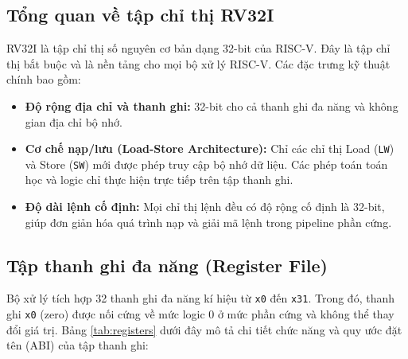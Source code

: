 \subsection{Tổng quan về tập chỉ thị RV32I}
RV32I là tập chỉ thị số nguyên cơ bản dạng 32-bit của RISC-V. Đây là tập chỉ thị bắt buộc và là nền tảng cho mọi bộ xử lý RISC-V. Các đặc trưng kỹ thuật chính bao gồm:
\begin{itemize}
    \item \textbf{Độ rộng địa chỉ và thanh ghi:} 32-bit cho cả thanh ghi đa năng và không gian địa chỉ bộ nhớ.
    \item \textbf{Cơ chế nạp/lưu (Load-Store Architecture):} Chỉ các chỉ thị Load (\texttt{LW}) và Store (\texttt{SW}) mới được phép truy cập bộ nhớ dữ liệu. Các phép toán toán học và logic chỉ thực hiện trực tiếp trên tập thanh ghi.
    \item \textbf{Độ dài lệnh cố định:} Mọi chỉ thị lệnh đều có độ rộng cố định là 32-bit, giúp đơn giản hóa quá trình nạp và giải mã lệnh trong pipeline phần cứng.
\end{itemize}

\subsection{Tập thanh ghi đa năng (Register File)}
Bộ xử lý tích hợp 32 thanh ghi đa năng kí hiệu từ \texttt{x0} đến \texttt{x31}. Trong đó, thanh ghi \texttt{x0} (zero) được nối cứng về mức logic 0 ở mức phần cứng và không thể thay đổi giá trị. Bảng \ref{tab:registers} dưới đây mô tả chi tiết chức năng và quy ước đặt tên (ABI) của tập thanh ghi:

